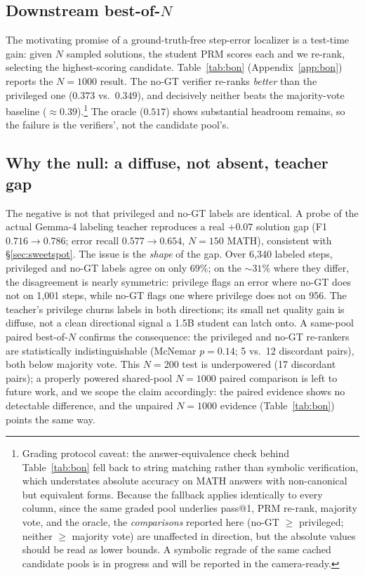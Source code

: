 \documentclass{article}
\begin{document}
\subsection{Downstream best-of-$N$}
The motivating promise of a ground-truth-free step-error localizer is a
test-time gain: given $N$ sampled solutions, the student PRM scores each and
we re-rank, selecting the highest-scoring candidate.
Table~\ref{tab:bon} (Appendix~\ref{app:bon})
reports the $N=1000$ result. The no-GT verifier re-ranks \emph{better} than
the privileged one ($0.373$ vs.\ $0.349$), and decisively neither beats the
majority-vote baseline ($\approx 0.39$).\footnote{Grading protocol caveat: the
answer-equivalence check behind Table~\ref{tab:bon} fell back to string
matching rather than symbolic verification, which understates absolute accuracy
on MATH answers with non-canonical but equivalent forms. Because the fallback
applies identically to every column, since the same graded pool underlies
pass@1, PRM re-rank, majority vote, and the oracle, the \emph{comparisons} reported
here (no-GT $\geq$ privileged; neither $\geq$ majority vote) are unaffected in
direction, but the absolute values should be read as lower bounds. A symbolic
regrade of the same cached candidate pools is in progress and will be reported
in the camera-ready.} The oracle ($0.517$) shows substantial headroom remains,
so the failure is the verifiers', not the candidate pool's.

\subsection{Why the null: a diffuse, not absent, teacher gap}
\label{sec:diffuse}
The negative is not that privileged and no-GT labels are identical. A probe
of the actual Gemma-4 labeling teacher reproduces a real $+0.07$
solution gap (F1 $0.716 \to 0.786$; error recall $0.577 \to 0.654$, $N=150$
MATH), consistent with \S\ref{sec:sweetspot}. The issue is the
\emph{shape} of the gap. Over 6{,}340 labeled steps, privileged and no-GT
labels agree on only $69\%$; on the $\sim 31\%$ where they differ, the
disagreement is nearly symmetric: privilege flags an error where no-GT does
not on 1{,}001 steps, while no-GT flags one where privilege does not on
956. The teacher's privilege churns labels in both directions; its small net
quality gain is diffuse, not a clean directional signal a 1.5B student can
latch onto. A same-pool paired best-of-$N$ confirms the consequence: the
privileged and no-GT re-rankers are statistically indistinguishable
(McNemar $p=0.14$; 5 vs.\ 12 discordant pairs), both below majority vote.
This $N=200$ test is underpowered (17 discordant pairs); a properly powered
shared-pool $N=1000$ paired comparison is left to future work, and we scope
the claim accordingly: the paired evidence shows no detectable difference, and
the unpaired $N=1000$ evidence (Table~\ref{tab:bon}) points the same way.
\end{document}
